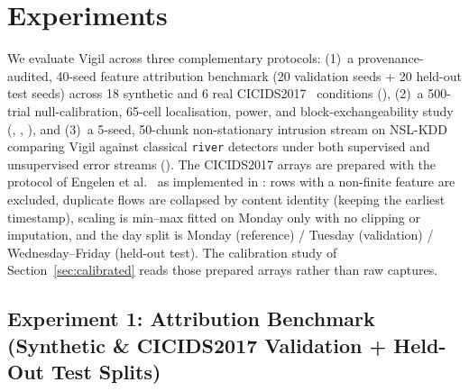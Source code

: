 \documentclass[10pt,conference]{IEEEtran}
\begin{document}
\section{Experiments}
\label{sec:experiments}

We evaluate Vigil across three complementary protocols: (1)~a provenance-audited,
40-seed feature attribution benchmark (20 validation seeds + 20 held-out test
seeds) across 18 synthetic and 6 real CICIDS2017~\cite{sharafaldin2018cicids}
conditions (), (2)~a 500-trial null-calibration,
65-cell localisation, power, and block-exchangeability study
(, ,
), and (3)~a 5-seed,
50-chunk non-stationary intrusion stream on NSL-KDD~\cite{tavallaee2009nsl}
comparing Vigil against classical \texttt{river} detectors under both supervised
and unsupervised error streams ().
The CICIDS2017 arrays are prepared with the protocol of Engelen et
al.~\cite{engelen2021troubleshooting} as implemented in
: rows with a non-finite
feature are excluded, duplicate flows are collapsed by content identity (keeping
the earliest timestamp), scaling is min--max fitted on Monday only with no
clipping or imputation, and the day split is Monday (reference) / Tuesday
(validation) / Wednesday--Friday (held-out test). The calibration study of
Section~\ref{sec:calibrated} reads those prepared arrays rather than raw
captures.

\subsection{Experiment 1: Attribution Benchmark (Synthetic \& CICIDS2017 Validation + Held-Out Test Splits)}
\end{document}
